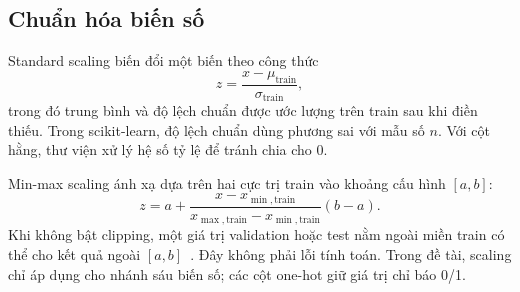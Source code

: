 \subsection{Chuẩn hóa biến số}
\label{subsec:2_2_3}
Standard scaling biến đổi một biến theo công thức
\begin{equation}
z=\frac{x-\mu_{\mathrm{train}}}{\sigma_{\mathrm{train}}},
\end{equation}
trong đó trung bình và độ lệch chuẩn được ước lượng trên train sau khi điền thiếu. Trong scikit-learn, độ lệch chuẩn dùng phương sai với mẫu số $n$. Với cột hằng, thư viện xử lý hệ số tỷ lệ để tránh chia cho 0.

Min-max scaling ánh xạ dựa trên hai cực trị train vào khoảng cấu hình $[a,b]$:
\begin{equation}
z=a+\frac{x-x_{\min,\mathrm{train}}}{x_{\max,\mathrm{train}}-x_{\min,\mathrm{train}}}(b-a).
\end{equation}
Khi không bật clipping, một giá trị validation hoặc test nằm ngoài miền train có thể cho kết quả ngoài $[a,b]$~\cite{sklearn-preprocessing}. Đây không phải lỗi tính toán. Trong đề tài, scaling chỉ áp dụng cho nhánh sáu biến số; các cột one-hot giữ giá trị chỉ báo 0/1.
